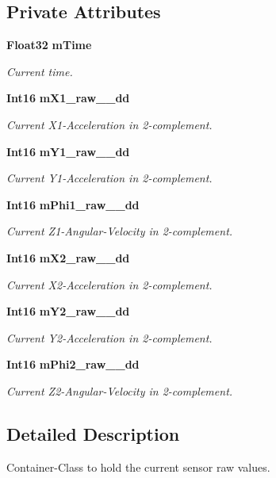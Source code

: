 \subsection*{Private Attributes}
\begin{DoxyCompactItemize}
\item 
{\bf Float32} {\bf m\-Time}
\begin{DoxyCompactList}\small\item\em Current time. \end{DoxyCompactList}\item 
{\bf Int16} {\bf m\-X1\-\_\-raw\-\_\-\-\_\-dd}
\begin{DoxyCompactList}\small\item\em Current X1-\/\-Acceleration in 2-\/complement. \end{DoxyCompactList}\item 
{\bf Int16} {\bf m\-Y1\-\_\-raw\-\_\-\-\_\-dd}
\begin{DoxyCompactList}\small\item\em Current Y1-\/\-Acceleration in 2-\/complement. \end{DoxyCompactList}\item 
{\bf Int16} {\bf m\-Phi1\-\_\-raw\-\_\-\-\_\-dd}
\begin{DoxyCompactList}\small\item\em Current Z1-\/\-Angular-\/\-Velocity in 2-\/complement. \end{DoxyCompactList}\item 
{\bf Int16} {\bf m\-X2\-\_\-raw\-\_\-\-\_\-dd}
\begin{DoxyCompactList}\small\item\em Current X2-\/\-Acceleration in 2-\/complement. \end{DoxyCompactList}\item 
{\bf Int16} {\bf m\-Y2\-\_\-raw\-\_\-\-\_\-dd}
\begin{DoxyCompactList}\small\item\em Current Y2-\/\-Acceleration in 2-\/complement. \end{DoxyCompactList}\item 
{\bf Int16} {\bf m\-Phi2\-\_\-raw\-\_\-\-\_\-dd}
\begin{DoxyCompactList}\small\item\em Current Z2-\/\-Angular-\/\-Velocity in 2-\/complement. \end{DoxyCompactList}\end{DoxyCompactItemize}


\subsection{Detailed Description}
Container-\/\-Class to hold the current sensor raw values. 

